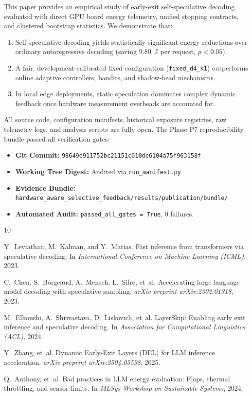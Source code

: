 \documentclass[10pt,twocolumn,letterpaper]{article}
\begin{document}
This paper provides an empirical study of early-exit self-speculative decoding evaluated with direct GPU board energy telemetry, unified stopping contracts, and clustered bootstrap statistics. We demonstrate that:
\begin{enumerate}
    \item Self-speculative decoding yields statistically significant energy reductions over ordinary autoregressive decoding (saving 9.80~J per request, $p < 0.05$).
    \item A fair, development-calibrated fixed configuration (\texttt{fixed\_d4\_k1}) outperforms online adaptive controllers, bandits, and shadow-head mechanisms.
    \item In local edge deployments, static speculation dominates complex dynamic feedback once hardware measurement overheads are accounted for.
\end{enumerate}

All source code, configuration manifests, historical exposure registries, raw telemetry logs, and analysis scripts are fully open. The Phase P7 reproducibility bundle passed all verification gates:
\begin{itemize}
    \item \textbf{Git Commit:} \texttt{98649e911752bc21151c010dc6104a75f963158f}
    \item \textbf{Working Tree Digest:} Audited via \texttt{run\_manifest.py}
    \item \textbf{Evidence Bundle:} \texttt{hardware\_aware\_selective\_feedback/results/publication/bundle/}
    \item \textbf{Automated Audit:} \texttt{passed\_all\_gates = True}, 0 failures.
\end{itemize}

\begin{thebibliography}{10}

Y.~Leviathan, M.~Kalman, and Y.~Matias.
\newblock Fast inference from transformers via speculative decoding.
\newblock In \emph{International Conference on Machine Learning (ICML)}, 2023.

C.~Chen, S.~Borgeaud, A.~Mensch, L.~Sifre, et~al.
\newblock Accelerating large language model decoding with speculative sampling.
\newblock \emph{arXiv preprint arXiv:2302.01318}, 2023.

M.~Elhoushi, A.~Shrivastava, D.~Liskovich, et~al.
\newblock LayerSkip: Enabling early exit inference and speculative decoding.
\newblock In \emph{Association for Computational Linguistics (ACL)}, 2024.

Y.~Zhang, et~al.
\newblock Dynamic Early-Exit Layers (DEL) for LLM inference acceleration.
\newblock \emph{arXiv preprint arXiv:2504.05598}, 2025.

Q.~Anthony, et~al.
\newblock Bad practices in LLM energy evaluation: Flops, thermal throttling, and sensor limits.
\newblock In \emph{MLSys Workshop on Sustainable Systems}, 2024.

\end{thebibliography}
\end{document}
